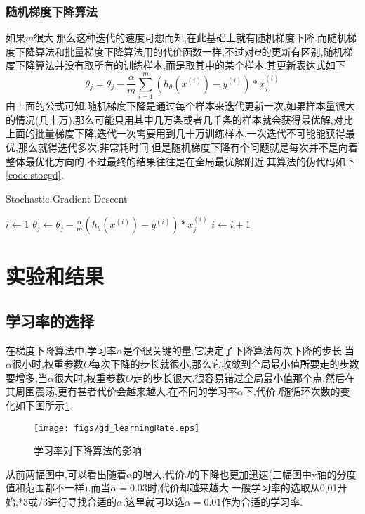 \subsubsection{随机梯度下降算法}
如果$m$很大,那么这种迭代的速度可想而知,在此基础上就有随机梯度下降.而随机梯度下降算法和批量梯度下降算法用的代价函数一样,不过对$\Theta$的更新有区别,随机梯度下降算法并没有取所有的训练样本,而是取其中的某个样本.其更新表达式如下
\begin{equation}
\theta_j = \theta_j - \frac{\alpha}{m} \sum_{i=1}^m (h_{\theta}(x^{(i)})-y^{(i)})*x_j^{(i)}
\end{equation}
由上面的公式可知,随机梯度下降是通过每个样本来迭代更新一次,如果样本量很大的情况(几十万),那么可能只用其中几万条或者几千条的样本就会获得最优解,对比上面的批量梯度下降,迭代一次需要用到几十万训练样本,一次迭代不可能能获得最优,那么就得迭代多次,非常耗时间.但是随机梯度下降有个问题就是每次并不是向着整体最优化方向的,不过最终的结果往往是在全局最优解附近.其算法的伪代码如下\ref{code:stocgd}.
\begin{algorithm}[h]
\caption{Stochastic Gradient Descent}
\label{code:stocgd}
\begin{algorithmic}[1]
\State $i \gets 1$
\State	$\theta_j \gets \theta_j - \frac{\alpha}{m} (h_{\theta}(x^{(i)})-y^{(i)})*x_j^{(i)}$ 
\State $i \gets i+1$
\EndWhile
\end{algorithmic}
\end{algorithm}


\section{实验和结果}
\subsection{学习率的选择}
在梯度下降算法中,学习率$\alpha$是个很关键的量,它决定了下降算法每次下降的步长.当$\alpha$很小时,权重参数$\Theta$每次下降的步长就很小,那么它收敛到全局最小值所要走的步数要增多;当$\alpha$很大时,权重参数$\Theta$走的步长很大,很容易错过全局最小值那个点,然后在其周围震荡,更有甚者代价会越来越大.在不同的学习率$\alpha$下,代价$J$随循环次数的变化如下图所示\ref{gd:figure:learingRate}.
\begin{figure}[!htbp]
	\centering
	\texttt{[image: figs/gd\_learningRate.eps]} 
	\caption{学习率对下降算法的影响}    
	\label{gd:figure:learingRate}
\end{figure}


从前两幅图中,可以看出随着$\alpha$的增大,代价$J$的下降也更加迅速(三幅图中y轴的分度值和范围都不一样).而当$\alpha=0.03$时,代价却越来越大.一般学习率的选取从0,01开始,*3或/3进行寻找合适的$\alpha$,这里就可以选$\alpha=0.01$作为合适的学习率.


